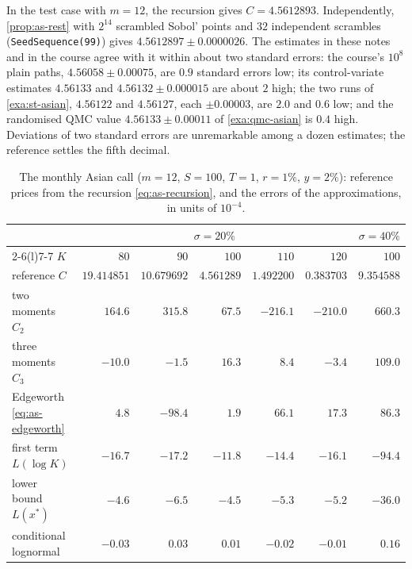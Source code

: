 \begin{example}\label{exa:as-reference}
In the test case with $m=12$, the recursion gives $C=4.5612893$. Independently,
\cref{prop:as-rest} with $2^{14}$ scrambled Sobol' points and $32$ independent scrambles
(\texttt{SeedSequence(99)}) gives $4.5612897\pm0.0000026$. The estimates in these notes and in the
course agree with it within about two standard errors: the course's $10^8$ plain paths,
$4.56058\pm0.00075$, are $0.9$ standard errors low; its control-variate estimates $4.56133$ and
$4.56132\pm0.000015$ are about $2$ high; the two runs of \cref{exa:st-asian}, $4.56122$ and
$4.56127$, each $\pm0.00003$, are $2.0$ and $0.6$ low; and the randomised QMC value
$4.56133\pm0.00011$ of \cref{exa:qmc-asian} is $0.4$ high. Deviations of two standard errors
are unremarkable among a dozen estimates; the reference settles the fifth decimal.
\end{example}

\begin{table}[ht]
  \centering
  \small
  \begin{tabular}{@{}lrrrrrr@{}}
    \toprule
    & \multicolumn{5}{c}{$\sigma=20\%$} & $\sigma=40\%$\\
    \cmidrule(lr){2-6}\cmidrule(l){7-7}
    $K$ & $80$ & $90$ & $100$ & $110$ & $120$ & $100$\\
    \midrule
    reference $C$ & $19.414851$ & $10.679692$ & $4.561289$ & $1.492200$ & $0.383703$ & $9.354588$\\
    two moments $C_2$ & $164.6$ & $315.8$ & $67.5$ & $-216.1$ & $-210.0$ & $660.3$\\
    three moments $C_3$ & $-10.0$ & $-1.5$ & $16.3$ & $8.4$ & $-3.4$ & $109.0$\\
    Edgeworth \eqref{eq:as-edgeworth} & $4.8$ & $-98.4$ & $1.9$ & $66.1$ & $17.3$ & $86.3$\\
    first term $L(\log K)$ & $-16.7$ & $-17.2$ & $-11.8$ & $-14.4$ & $-16.1$ & $-94.4$\\
    lower bound $L(x^*)$ & $-4.6$ & $-6.5$ & $-4.5$ & $-5.3$ & $-5.2$ & $-36.0$\\
    conditional lognormal & $-0.03$ & $0.03$ & $0.01$ & $-0.02$ & $-0.01$ & $0.16$\\
    \bottomrule
  \end{tabular}
  \caption{The monthly Asian call ($m=12$, $S=100$, $T=1$, $r=1\%$, $y=2\%$): reference prices from
    the recursion \eqref{eq:as-recursion}, and the errors of the approximations, in units of
    $10^{-4}$.}
  \label{tab:as-approx}
\end{table}

